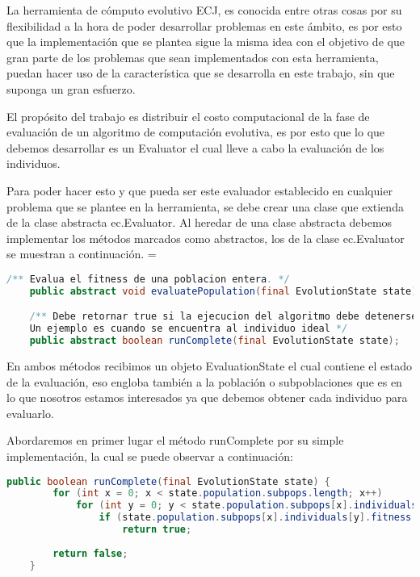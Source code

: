 La herramienta de c\'omputo evolutivo ECJ, es conocida entre otras cosas por su flexibilidad a la hora de poder desarrollar problemas en este ámbito, es por esto que la implementación que se plantea sigue la misma idea con el objetivo de que gran parte de los problemas que sean implementados con esta herramienta, puedan hacer uso de la característica que se desarrolla en este trabajo, sin que suponga un gran esfuerzo.
\label{desarrollo-implementacion}

El propósito del trabajo es distribuir el costo computacional de la fase de evaluación de un algoritmo de computación evolutiva, es por esto que lo que debemos desarrollar es un Evaluator  el cual lleve a cabo la evaluación de los individuos.

Para poder hacer esto y que pueda ser este evaluador establecido en cualquier problema que se plantee en la herramienta, se debe crear una clase que extienda de la clase abstracta ec.Evaluator. Al heredar de una clase abstracta debemos implementar los métodos marcados como abstractos, los de la clase ec.Evaluator se muestran a continuación.
=
\begin{lstlisting}[language=Java]
    /** Evalua el fitness de una poblacion entera. */
    public abstract void evaluatePopulation(final EvolutionState state);

    /** Debe retornar true si la ejecucion del algoritmo debe detenerse por algun motivo.
    Un ejemplo es cuando se encuentra al individuo ideal */
    public abstract boolean runComplete(final EvolutionState state);
\end{lstlisting}

En ambos métodos recibimos un objeto EvaluationState el cual contiene el estado de la evaluación, eso engloba también a la población o subpoblaciones que es en lo que nosotros estamos interesados ya que debemos obtener cada individuo para evaluarlo.

Abordaremos en primer lugar el método runComplete por su simple implementación, la cual se puede observar a continuación:

\begin{lstlisting}[language=Java]
	public boolean runComplete(final EvolutionState state) {
		for (int x = 0; x < state.population.subpops.length; x++)
			for (int y = 0; y < state.population.subpops[x].individuals.length; y++)
				if (state.population.subpops[x].individuals[y].fitness.isIdealFitness())
					return true;
		
		return false;
	}
\end{lstlisting}

